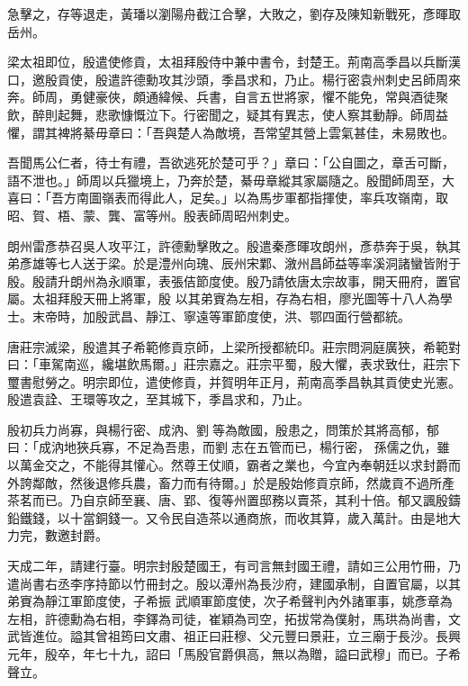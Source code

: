 \begin{pinyinscope}
 急擊之，存等退走，黃璠以瀏陽舟截江合擊，大敗之，劉存及陳知新戰死，彥暉取岳州。



 梁太祖即位，殷遣使修貢，太祖拜殷侍中兼中書令，封楚王。荊南高季昌以兵斷漢口，邀殷貢使，殷遣許德勳攻其沙頭，季昌求和，乃止。楊行密袁州刺史呂師周來奔。師周，勇健豪俠，頗通緯候、兵書，自言五世將家，懼不能免，常與酒徒聚飲，醉則起舞，悲歌慷慨泣下。行密聞之，疑其有異志，使人察其動靜。師周益懼，謂其裨將綦毋章曰：「吾與楚人為敵境，吾常望其營上雲氣甚佳，未易敗也。



 吾聞馬公仁者，待士有禮，吾欲逃死於楚可乎？」章曰：「公自圖之，章舌可斷，語不泄也。」師周以兵獵境上，乃奔於楚，綦毋章縱其家屬隨之。殷聞師周至，大喜曰：「吾方南圖嶺表而得此人，足矣。」以為馬步軍都指揮使，率兵攻嶺南，取昭、賀、梧、蒙、龔、富等州。殷表師周昭州刺史。



 朗州雷彥恭召吳人攻平江，許德勳擊敗之。殷遣秦彥暉攻朗州，彥恭奔于吳，執其弟彥雄等七人送于梁。於是澧州向瑰、辰州宋鄴、漵州昌師益等率溪洞諸蠻皆附于殷。殷請升朗州為永順軍，表張佶節度使。殷乃請依唐太宗故事，開天冊府，置官屬。太祖拜殷天冊上將軍，殷
 以其弟賨為左相，存為右相，廖光圖等十八人為學士。末帝時，加殷武昌、靜江、寧遠等軍節度使，洪、鄂四面行營都統。



 唐莊宗滅梁，殷遣其子希範修貢京師，上梁所授都統印。莊宗問洞庭廣狹，希範對曰：「車駕南巡，纔堪飲馬爾。」莊宗嘉之。莊宗平蜀，殷大懼，表求致仕，莊宗下璽書慰勞之。明宗即位，遣使修貢，并賀明年正月，荊南高季昌執其貢使史光憲。殷遣袁詮、王環等攻之，至其城下，季昌求和，乃止。



 殷初兵力尚寡，與楊行密、成汭、劉等為敵國，殷患之，問策於其將高郁，郁曰：「成汭地狹兵寡，不足為吾患，而劉志在五管而已，楊行密，
 孫儒之仇，雖以萬金交之，不能得其懽心。然尊王仗順，霸者之業也，今宜內奉朝廷以求封爵而外誇鄰敵，然後退修兵農，畜力而有待爾。」於是殷始修貢京師，然歲貢不過所產茶茗而已。乃自京師至襄、唐、郢、復等州置邸務以賣茶，其利十倍。郁又諷殷鑄鉛鐵錢，以十當銅錢一。又令民自造茶以通商旅，而收其算，歲入萬計。由是地大力完，數邀封爵。



 天成二年，請建行臺。明宗封殷楚國王，有司言無封國王禮，請如三公用竹冊，乃遣尚書右丞李序持節以竹冊封之。殷以潭州為長沙府，建國承制，自置官屬，以其弟賨為靜江軍節度使，子希振
 武順軍節度使，次子希聲判內外諸軍事，姚彥章為左相，許德勳為右相，李鐸為司徒，崔穎為司空，拓拔常為僕射，馬珙為尚書，文武皆進位。謚其曾祖筠曰文肅、祖正曰莊穆、父元豐曰景莊，立三廟于長沙。長興元年，殷卒，年七十九，詔曰「馬殷官爵俱高，無以為贈，謚曰武穆」而已。子希聲立。




\end{pinyinscope}
